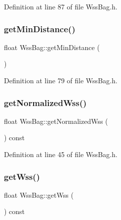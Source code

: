 Definition at line 87 of file Wss\+Bag.\+h.

\mbox{\label{class_wss_bag_a342ec7f142cd7d31c926c878667f2f2e}} 
\subsubsection{\texorpdfstring{get\+Min\+Distance()}{getMinDistance()}}
{\footnotesize\ttfamily float Wss\+Bag\+::get\+Min\+Distance (\begin{DoxyParamCaption}{ }\end{DoxyParamCaption})\hspace{0.3cm}{\ttfamily [inline]}}



Definition at line 79 of file Wss\+Bag.\+h.

\mbox{\label{class_wss_bag_a636fe904ed2f9154bd33fb5feb254961}} 
\subsubsection{\texorpdfstring{get\+Normalized\+Wss()}{getNormalizedWss()}}
{\footnotesize\ttfamily float Wss\+Bag\+::get\+Normalized\+Wss (\begin{DoxyParamCaption}{ }\end{DoxyParamCaption}) const\hspace{0.3cm}{\ttfamily [inline]}}



Definition at line 45 of file Wss\+Bag.\+h.

\mbox{\label{class_wss_bag_a4deab0c34ec6854d559eac6826e7f72d}} 
\subsubsection{\texorpdfstring{get\+Wss()}{getWss()}}
{\footnotesize\ttfamily float Wss\+Bag\+::get\+Wss (\begin{DoxyParamCaption}{ }\end{DoxyParamCaption}) const\hspace{0.3cm}{\ttfamily [inline]}}



